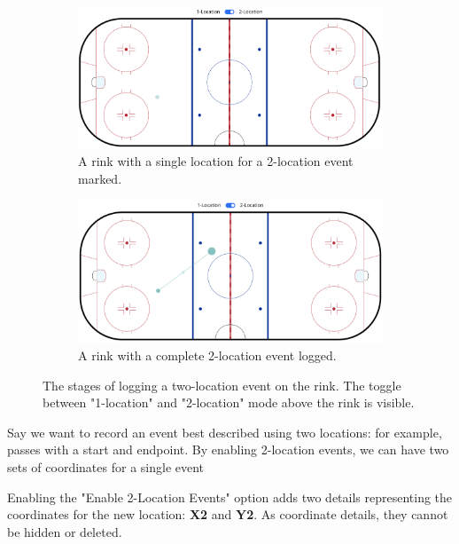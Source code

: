 \documentclass[letterpaper]{article}
\begin{document}
\begin{figure}[h]
		\begin{subfigure}{.5\textwidth}
	\centering
	\includegraphics[width=1\linewidth]{images/ghost-dot}
	\caption{A rink with a single location for a 2-location event marked.}
	\end{subfigure}
		\begin{subfigure}{.5\textwidth}
	\centering
	\includegraphics[width=1\linewidth]{images/two-location}
	\caption{A rink with a complete 2-location event logged.}
\end{subfigure}
\caption{The stages of logging a two-location event on the rink. The toggle between "1-location" and "2-location" mode above the rink is visible.}
\label{fig:two-location}
\end{figure}

Say we want to record an event best described using two locations: for example, passes with a start and endpoint. By enabling 2-location events, we can have two sets of coordinates for a single event

Enabling the "Enable 2-Location Events" option adds two details representing the coordinates for the new location: \textbf{X2} and \textbf{Y2}. As coordinate details, they cannot be hidden or deleted.
\end{document}
